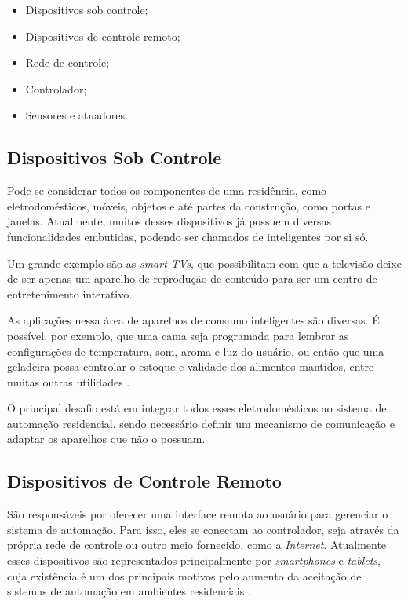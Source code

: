 \begin{itemize}
	\item Dispositivos sob controle;
	\item Dispositivos de controle remoto;
	\item Rede de controle;
	\item Controlador;
	\item Sensores e atuadores.
\end{itemize}

\subsection{Dispositivos Sob Controle}
Pode-se considerar todos os componentes de uma residência, como eletrodomésticos, móveis, objetos e até partes
da construção, como portas e janelas. Atualmente, muitos desses dispositivos já possuem diversas
funcionalidades embutidas, podendo ser chamados de inteligentes por si só.

Um grande exemplo são as \textit{smart TVs}, que possibilitam com que a televisão deixe de ser apenas um
aparelho de reprodução de conteúdo para ser um centro de entretenimento interativo.

As aplicações nessa área de aparelhos de consumo inteligentes são diversas. É possível, por exemplo, que uma
cama seja programada para lembrar as configurações de temperatura, som, aroma e luz do usuário, ou então que
uma geladeira possa controlar o estoque e validade dos alimentos mantidos, entre muitas outras utilidades
\cite{jiang_liu_yang2004}.

O principal desafio está em integrar todos esses eletrodomésticos ao sistema de automação residencial, sendo
necessário definir um mecanismo de comunicação e adaptar os aparelhos que não o possuam.

\subsection{Dispositivos de Controle Remoto}
São responsáveis por oferecer uma interface remota ao usuário para gerenciar o sistema de automação. Para
isso, eles se conectam ao controlador, seja através da própria rede de controle ou outro meio fornecido, como
a \textit{Internet}. Atualmente esses dispositivos são representados principalmente por \textit{smartphones} e
\textit{tablets}, cuja existência é um dos principais motivos pelo aumento da aceitação de sistemas de
automação em ambientes residenciais \cite{kyas2013}.

